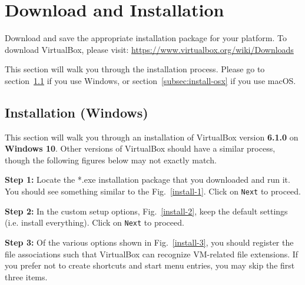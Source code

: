 \documentclass[11pt]{article}
\begin{document}
\section{Download and Installation}
\label{sec:download}
Download and save the appropriate installation package for your platform. To download VirtualBox, please visit: \url{https://www.virtualbox.org/wiki/Downloads}

This section will walk you through the installation process. Please go to section~\ref{subsec:install-windows} if you use Windows, or section~\ref{subsec:install-osx} if you use macOS.



\subsection{Installation (Windows)}
\label{subsec:install-windows}
This section will walk you through an installation of VirtualBox version \textbf{6.1.0} on \textbf{Windows 10}. Other versions of VirtualBox should have a similar process, though the following figures below may not exactly match.

\textbf{Step 1:} Locate the *.exe installation package that you downloaded and run it. You should see something similar to the Fig.~\ref{install-1}. Click on \texttt{Next} to proceed.

\textbf{Step 2:} In the custom setup options, Fig.~\ref{install-2}, keep the default settings (i.e. install everything). Click on \texttt{Next} to proceed.

\textbf{Step 3:} Of the various options shown in Fig.~\ref{install-3}, you should register the file associations such that VirtualBox can recognize VM-related file extensions. If you prefer not to create shortcuts and start menu entries, you may skip the first three items.
\end{document}
